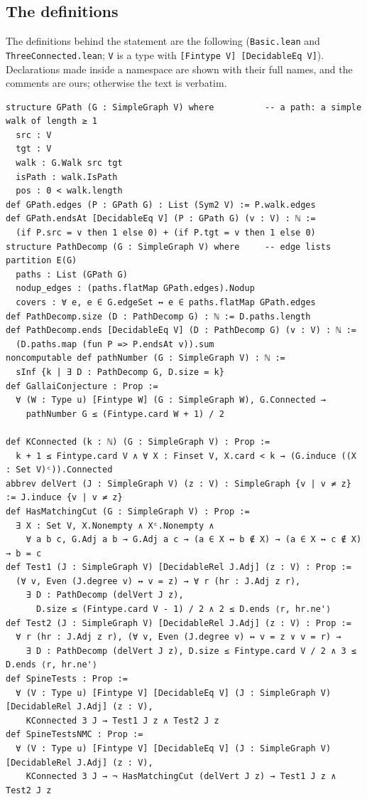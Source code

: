 \documentclass[11pt]{amsart}
\theoremstyle{definition}
\theoremstyle{remark}
\renewcommand{\_}{\oldunderscore\allowbreak}
\begin{document}
\subsection{The definitions}
The definitions behind the statement are the following (\texttt{Basic.lean} and
\texttt{ThreeConnected.lean}; \texttt{V} is a type with \texttt{[Fintype V] [DecidableEq V]}).
Declarations made inside a namespace are shown with their full names, and the comments are ours;
otherwise the text is verbatim.
{\footnotesize
\begin{verbatim}
structure GPath (G : SimpleGraph V) where          -- a path: a simple walk of length ≥ 1
  src : V
  tgt : V
  walk : G.Walk src tgt
  isPath : walk.IsPath
  pos : 0 < walk.length
def GPath.edges (P : GPath G) : List (Sym2 V) := P.walk.edges
def GPath.endsAt [DecidableEq V] (P : GPath G) (v : V) : ℕ :=
  (if P.src = v then 1 else 0) + (if P.tgt = v then 1 else 0)
structure PathDecomp (G : SimpleGraph V) where     -- edge lists partition E(G)
  paths : List (GPath G)
  nodup_edges : (paths.flatMap GPath.edges).Nodup
  covers : ∀ e, e ∈ G.edgeSet ↔ e ∈ paths.flatMap GPath.edges
def PathDecomp.size (D : PathDecomp G) : ℕ := D.paths.length
def PathDecomp.ends [DecidableEq V] (D : PathDecomp G) (v : V) : ℕ :=
  (D.paths.map (fun P => P.endsAt v)).sum
noncomputable def pathNumber (G : SimpleGraph V) : ℕ :=
  sInf {k | ∃ D : PathDecomp G, D.size = k}
def GallaiConjecture : Prop :=
  ∀ (W : Type u) [Fintype W] (G : SimpleGraph W), G.Connected →
    pathNumber G ≤ (Fintype.card W + 1) / 2

def KConnected (k : ℕ) (G : SimpleGraph V) : Prop :=
  k + 1 ≤ Fintype.card V ∧ ∀ X : Finset V, X.card < k → (G.induce ((X : Set V)ᶜ)).Connected
abbrev delVert (J : SimpleGraph V) (z : V) : SimpleGraph {v | v ≠ z} := J.induce {v | v ≠ z}
def HasMatchingCut (G : SimpleGraph V) : Prop :=
  ∃ X : Set V, X.Nonempty ∧ Xᶜ.Nonempty ∧
    ∀ a b c, G.Adj a b → G.Adj a c → (a ∈ X ↔ b ∉ X) → (a ∈ X ↔ c ∉ X) → b = c
def Test1 (J : SimpleGraph V) [DecidableRel J.Adj] (z : V) : Prop :=
  (∀ v, Even (J.degree v) ↔ v = z) → ∀ r (hr : J.Adj z r),
    ∃ D : PathDecomp (delVert J z),
      D.size ≤ (Fintype.card V - 1) / 2 ∧ 2 ≤ D.ends ⟨r, hr.ne'⟩
def Test2 (J : SimpleGraph V) [DecidableRel J.Adj] (z : V) : Prop :=
  ∀ r (hr : J.Adj z r), (∀ v, Even (J.degree v) ↔ v = z ∨ v = r) →
    ∃ D : PathDecomp (delVert J z), D.size ≤ Fintype.card V / 2 ∧ 3 ≤ D.ends ⟨r, hr.ne'⟩
def SpineTests : Prop :=
  ∀ (V : Type u) [Fintype V] [DecidableEq V] (J : SimpleGraph V) [DecidableRel J.Adj] (z : V),
    KConnected 3 J → Test1 J z ∧ Test2 J z
def SpineTestsNMC : Prop :=
  ∀ (V : Type u) [Fintype V] [DecidableEq V] (J : SimpleGraph V) [DecidableRel J.Adj] (z : V),
    KConnected 3 J → ¬ HasMatchingCut (delVert J z) → Test1 J z ∧ Test2 J z
\end{verbatim}
}
\end{document}
